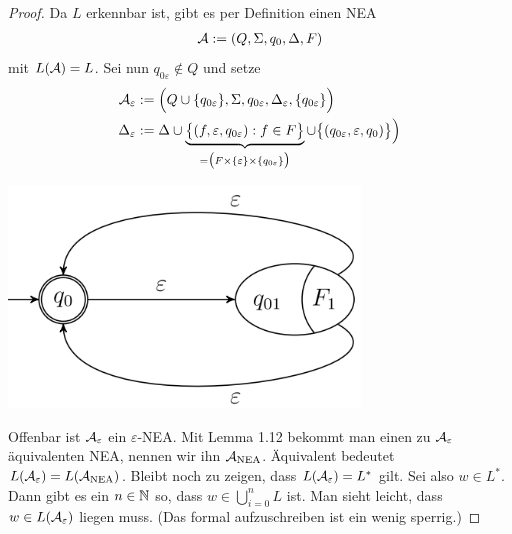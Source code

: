 \begin{proof}
	Da $L$ erkennbar ist, gibt es per Definition einen NEA
	\begin{align*}
		\mathcal{A}:=(Q,\Sigma,q_0,\Delta,F)
	\end{align*}
	mit $L(\mathcal{A})=L$. 
	Sei nun $q_{0\varepsilon}\not\in Q$ und setze
	\begin{align*}
		\mathcal{A}_\varepsilon&:=\Big(Q\cup\lbrace q_{0\varepsilon}\rbrace,\Sigma,q_{0\varepsilon},\Delta_\varepsilon,\lbrace q_{0\varepsilon}\rbrace\Big)\\
		\Delta_\varepsilon&:=\Delta\cup\underbrace{\big\lbrace(f,\varepsilon,q_{0\varepsilon}):f\in F\big\rbrace}_{
			=\big(F\times\lbrace\varepsilon\rbrace\times\lbrace q_{0\varepsilon}\rbrace\big)
		}\cup\big\lbrace(q_{0\varepsilon},\varepsilon,q_{0})\big\rbrace\Big)
	\end{align*}
	
	
  \includegraphics[width=0.7\textwidth]{pics/Blatt10_4.png}
  
  Offenbar ist $\mathcal{A}_\varepsilon$ ein $\varepsilon$-NEA. Mit Lemma 1.12 bekommt man einen zu $\mathcal{A}_\varepsilon$ äquivalenten NEA, nennen wir ihn $\mathcal{A}_{\text{NEA}}$. Äquivalent bedeutet $L(\mathcal{A}_\varepsilon)=L(\mathcal{A}_{\text{NEA}})$.\nl
  Bleibt noch zu zeigen, dass $L(\mathcal{A}_\varepsilon)=L^\ast$ gilt. 
  Sei also $w\in L^\ast$.
  Dann gibt es ein $n\in\mathbb{N}$ so, dass $w\in\bigcup\limits_{i=0}^n L$ ist. Man sieht leicht, dass $w\in L(\mathcal{A}_\varepsilon)$ liegen muss. (Das formal aufzuschreiben ist ein wenig sperrig.)
\end{proof}

